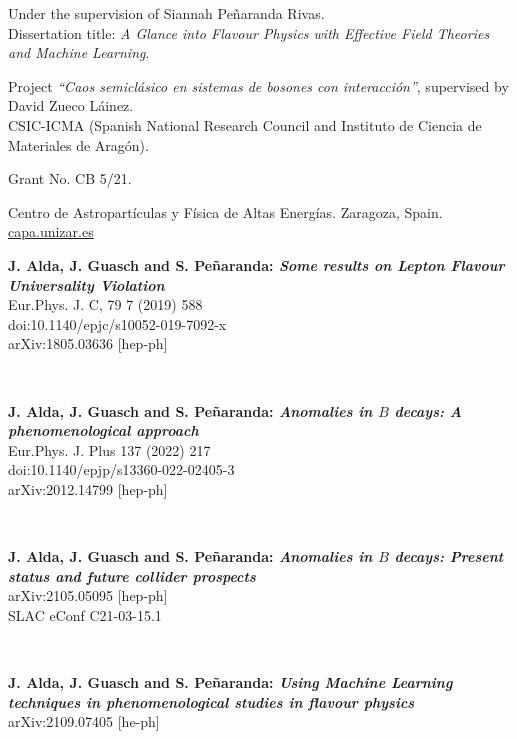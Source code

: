 \documentclass[combined.tex]{subfiles}
\begin{document}
Under the supervision of Siannah Peñaranda Rivas.\\
Dissertation title: \textit{A Glance into Flavour Physics with Effective Field Theories and Machine Learning}.

Project \textit{``Caos semiclásico en sistemas de bosones con interacción''}, supervised by David Zueco Láinez.\\
CSIC-ICMA (Spanish National Research Council and Instituto de Ciencia de Materiales de Aragón).


Grant No. CB 5/21.

Centro de Astropartículas y Física de Altas Energías. Zaragoza, Spain.\\
\url{capa.unizar.es}



\hspace{\parindent}
\textbf{J. Alda, J. Guasch and S. Peñaranda: \textit{Some results on Lepton Flavour Universality Violation}}\\
Eur.Phys. J. C, 79 7 (2019) 588\\
doi:10.1140/epjc/s10052-019-7092-x\\
arXiv:1805.03636 [hep-ph]

~

\textbf{J. Alda, J. Guasch and S. Peñaranda: \textit{Anomalies in $B$ decays: A phenomenological approach}}\\
Eur.Phys. J. Plus 137 (2022) 217\\
doi:10.1140/epjp/s13360-022-02405-3\\
arXiv:2012.14799 [hep-ph]

~

\textbf{J. Alda, J. Guasch and S. Peñaranda: \textit{Anomalies in $B$ decays: Present status and future collider prospects}}\\
arXiv:2105.05095 [hep-ph]\\
SLAC eConf C21-03-15.1

~

\textbf{J. Alda, J. Guasch and S. Peñaranda: \textit{Using Machine Learning techniques in phenomenological studies in flavour physics}}\\
arXiv:2109.07405 [he-ph]
\end{document}
